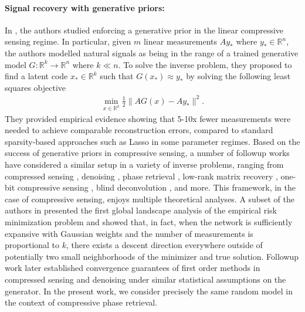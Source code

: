 \documentclass[11pt]{article}
\newcommand{\R}{\mathbb{R}}
\theoremstyle{remark}
\begin{document}

\paragraph{Signal recovery with generative priors:} In \cite{Price2017}, the authors studied  enforcing a generative prior in the linear compressive sensing regime. In particular, given $m$ linear measurements $Ay_*$ where $y_* \in \R^n$, the authors modelled natural signals as being in the range of a trained  generative model $G : \R^k \rightarrow \R^n$ where $k \ll n$. To solve the inverse problem, they proposed to find a latent code $x_* \in \R^k$ such that $G(x_*) \approx y_*$ by solving the following least squares objective \begin{align}
\min_{x \in \R^k} \frac{1}{2} \Big\|AG(x) - Ay_*\Big\|^2. \label{bora_obj}
\end{align} They provided empirical evidence showing that 5-10x fewer measurements were needed to achieve comparable reconstruction errors, compared to standard sparsity-based approaches such as Lasso in some parameter regimes. Based on the success of generative priors in compressive sensing, a number of followup works have considered a similar setup in a variety of inverse problems, ranging from compressed sensing \cite{HV2016, Huangetal2018, ShahDCS2018, ADMMGenPrior, Songetal19}, denoising \cite{Heckeletal2018}, phase retrieval \cite{HLV18, Shamshad2018}, low-rank matrix recovery \cite{CHV20, SpikedGenPrior19}, one-bit compressive sensing \cite{Qiuetal19, Liuetal20}, blind deconvolution \cite{Shamshad2018, JoshiHand19}, and more.
This framework, in the case of compressive sensing, enjoys multiple theoretical analyses. A subset of the authors in \cite{HV2016} presented the first global landscape analysis of the empirical risk minimization problem and showed that, in fact, when the network is sufficiently expansive with Gaussian weights and the number of measurements is proportional to $k$, there exists a descent direction everywhere outside of potentially two small neighborhoods of the minimizer and true solution. Followup work later established convergence guarantees of first order methods in compressed sensing \cite{Huangetal2018} and denoising \cite{Heckeletal2018} under similar statistical assumptions on the generator. In the present work, we consider precisely the same random model in the context of compressive phase retrieval. %
\end{document}
